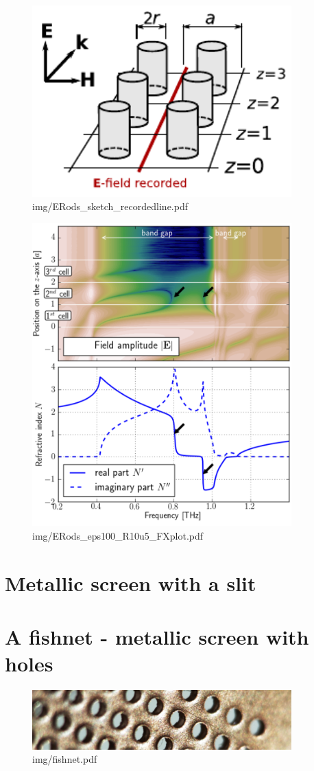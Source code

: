 \begin{figure} \caption{img/ERods\_sketch\_recordedline.pdf}  \centering  \includegraphics[width=10cm]{img/ERods_sketch_recordedline.pdf} \end{figure} \clearpage
\begin{figure} \caption{img/ERods\_eps100\_R10u5\_FXplot.pdf}  \centering \includegraphics[width=10cm]{img/ERods_eps100_R10u5_FXplot.pdf} \end{figure} \clearpage

\section{Metallic screen with a slit} %

\section{A fishnet - metallic screen with holes} %
\cite{yahiaoui2012metallo,rockstuhl2008light}
\begin{figure} \caption{img/fishnet.pdf}  \centering \includegraphics[width=10cm]{img/fishnet.pdf} \end{figure} \clearpage


